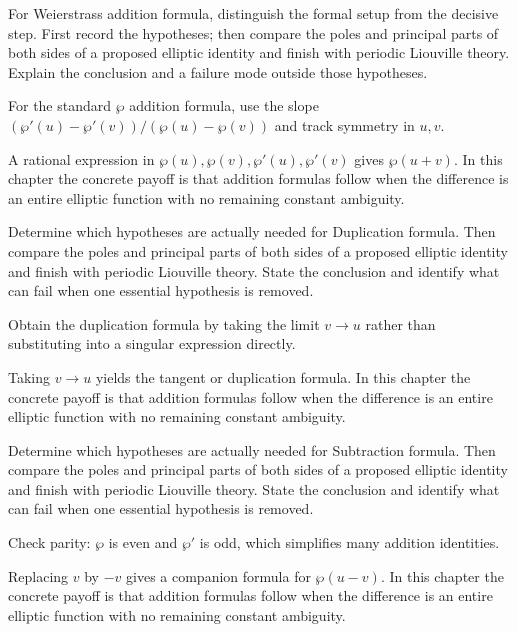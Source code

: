 \begin{exercise}\label{exr:iv30-03}
For Weierstrass addition formula, distinguish the formal setup from the decisive step. First record the hypotheses; then compare the poles and principal parts of both sides of a proposed elliptic identity and finish with periodic Liouville theory. Explain the conclusion and a failure mode outside those hypotheses.
\end{exercise}
\begin{hint}
For the standard \(\wp\) addition formula, use the slope \((\wp'(u)-\wp'(v))/(\wp(u)-\wp(v))\) and track symmetry in \(u,v\).
\end{hint}
\begin{solution}
A rational expression in $\wp(u),\wp(v),\wp'(u),\wp'(v)$ gives $\wp(u+v)$. In this chapter the concrete payoff is that addition formulas follow when the difference is an entire elliptic function with no remaining constant ambiguity.
\end{solution}

\begin{exercise}\label{exr:iv30-04}
Determine which hypotheses are actually needed for Duplication formula. Then compare the poles and principal parts of both sides of a proposed elliptic identity and finish with periodic Liouville theory. State the conclusion and identify what can fail when one essential hypothesis is removed.
\end{exercise}
\begin{hint}
Obtain the duplication formula by taking the limit \(v\to u\) rather than substituting into a singular expression directly.
\end{hint}
\begin{solution}
Taking $v\to u$ yields the tangent or duplication formula. In this chapter the concrete payoff is that addition formulas follow when the difference is an entire elliptic function with no remaining constant ambiguity.
\end{solution}

\begin{exercise}\label{exr:iv30-05}
Determine which hypotheses are actually needed for Subtraction formula. Then compare the poles and principal parts of both sides of a proposed elliptic identity and finish with periodic Liouville theory. State the conclusion and identify what can fail when one essential hypothesis is removed.
\end{exercise}
\begin{hint}
Check parity: \(\wp\) is even and \(\wp'\) is odd, which simplifies many addition identities.
\end{hint}
\begin{solution}
Replacing $v$ by $-v$ gives a companion formula for $\wp(u-v)$. In this chapter the concrete payoff is that addition formulas follow when the difference is an entire elliptic function with no remaining constant ambiguity.
\end{solution}

